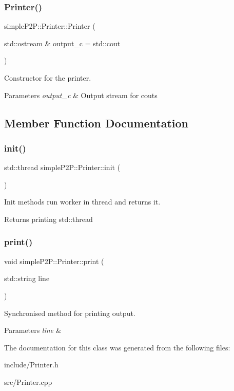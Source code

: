 \subsubsection{\texorpdfstring{Printer()}{Printer()}}
{\footnotesize\ttfamily simple\+P2\+P\+::\+Printer\+::\+Printer (\begin{DoxyParamCaption}\item[{std\+::ostream \&}]{output\+\_\+c = {\ttfamily std\+:\+:cout} }\end{DoxyParamCaption})}



Constructor for the printer. 


\begin{DoxyParams}{Parameters}
{\em output\+\_\+c} & Output stream for couts \\
\hline
\end{DoxyParams}


\subsection{Member Function Documentation}
\mbox{\label{classsimpleP2P_1_1Printer_a9291e626c231334f26c305ab51e6cf19}} 
\subsubsection{\texorpdfstring{init()}{init()}}
{\footnotesize\ttfamily std\+::thread simple\+P2\+P\+::\+Printer\+::init (\begin{DoxyParamCaption}{ }\end{DoxyParamCaption})}



Init methods run worker in thread and returns it. 

\begin{DoxyReturn}{Returns}
printing std\+::thread 
\end{DoxyReturn}
\mbox{\label{classsimpleP2P_1_1Printer_a296b8acb2cf397eaab98087efd8959db}} 
\subsubsection{\texorpdfstring{print()}{print()}}
{\footnotesize\ttfamily void simple\+P2\+P\+::\+Printer\+::print (\begin{DoxyParamCaption}\item[{std\+::string}]{line }\end{DoxyParamCaption})}



Synchronised method for printing output. 


\begin{DoxyParams}{Parameters}
{\em line} & \\
\hline
\end{DoxyParams}


The documentation for this class was generated from the following files\+:\begin{DoxyCompactItemize}
\item 
include/Printer.\+h\item 
src/Printer.\+cpp\end{DoxyCompactItemize}
